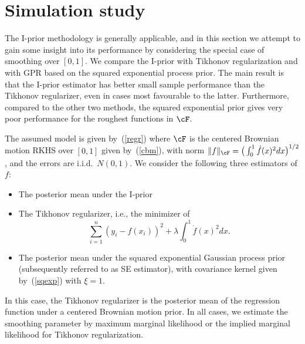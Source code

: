 \documentclass[preprint,12pt,authoryear]{elsarticle}
\DeclarePairedDelimiter{\norm}{\lVert}{\rVert}
\begin{document}
\section{Simulation study}\label{sec-sim}

The I-prior methodology is generally applicable, and in this section we attempt to gain some insight into its performance by considering the special case of smoothing over $[0,1]$. We compare the I-prior with Tikhonov regularization and with GPR based on the squared exponential process prior. The main result is that the I-prior estimator has better small sample performance than the Tikhonov regularizer, even in cases most favourable to the latter. Furthermore, compared to the other two methods, the squared exponential prior gives very poor performance for the roughest functions in $\cF$. 


The assumed model is given by~(\ref{regr}) where $\cF$ is the centered Brownian motion RKHS over $[0,1]$ given by~(\ref{cbm}), with norm  $\norm{f}_\cF=\big(\int_0^1 \dot f(x)^2dx\big)^{1/2}$, and the errors are i.i.d.\  $N(0,1)$. 
We consider the following three estimators of $f$: 
\begin{itemize}
	
	\item The posterior mean under the I-prior
	
	\item The Tikhonov regularizer, i.e., the minimizer of
	\[  \sum_{i=1}^n(y_i-f(x_i))^2 + \lambda \int_0^1 \dot f(x)^2dx. \]
	
	\item The posterior mean under the squared exponential Gaussian process prior (subsequently referred to as SE estimator), with covariance kernel given by~(\ref{sqexp}) with $\xi=1$. 
	
\end{itemize}
In this case, the Tikhonov regularizer is the posterior mean of the regression function under a centered Brownian motion prior. 
In all cases, we estimate the smoothing parameter by maximum marginal likelihood or the implied marginal likelihood for Tikhonov regularization. 
\end{document}
